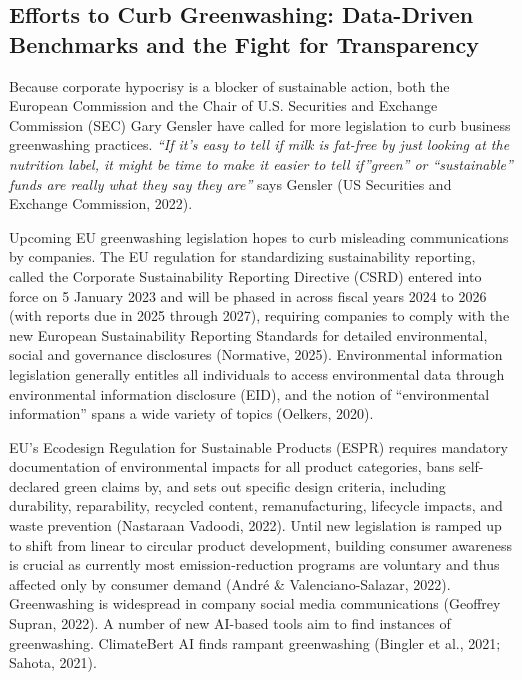 \documentclass[
  12pt,
  letterpaper,
  DIV=11,
  numbers=noendperiod]{scrartcl}
\begin{document}
\let\pandoctableshortcapt\relax

\subsection{Efforts to Curb Greenwashing: Data-Driven Benchmarks and the
Fight for
Transparency}\label{efforts-to-curb-greenwashing-data-driven-benchmarks-and-the-fight-for-transparency}

Because corporate hypocrisy is a blocker of sustainable action, both the
European Commission and the Chair of U.S. Securities and Exchange
Commission (SEC) Gary Gensler have called for more legislation to curb
business greenwashing practices. \emph{``If it's easy to tell if milk is
fat-free by just looking at the nutrition label, it might be time to
make it easier to tell if''green'' or ``sustainable'' funds are really
what they say they are''} says Gensler (US Securities and Exchange
Commission, 2022).

Upcoming EU greenwashing legislation hopes to curb misleading
communications by companies. The EU regulation for standardizing
sustainability reporting, called the Corporate Sustainability Reporting
Directive (CSRD) entered into force on 5 January 2023 and will be phased
in across fiscal years 2024 to 2026 (with reports due in 2025 through
2027), requiring companies to comply with the new European
Sustainability Reporting Standards for detailed environmental, social
and governance disclosures (Normative, 2025). Environmental information
legislation generally entitles all individuals to access environmental
data through environmental information disclosure (EID), and the notion
of ``environmental information'' spans a wide variety of topics
(Oelkers, 2020).

EU's Ecodesign Regulation for Sustainable Products (ESPR) requires
mandatory documentation of environmental impacts for all product
categories, bans self-declared green claims by, and sets out specific
design criteria, including durability, reparability, recycled content,
remanufacturing, lifecycle impacts, and waste prevention (Nastaraan
Vadoodi, 2022). Until new legislation is ramped up to shift from linear
to circular product development, building consumer awareness is crucial
as currently most emission-reduction programs are voluntary and thus
affected only by consumer demand (André \& Valenciano-Salazar, 2022).
Greenwashing is widespread in company social media communications
(Geoffrey Supran, 2022). A number of new AI-based tools aim to find
instances of greenwashing. ClimateBert AI finds rampant greenwashing
(Bingler et al., 2021; Sahota, 2021).
\end{document}
